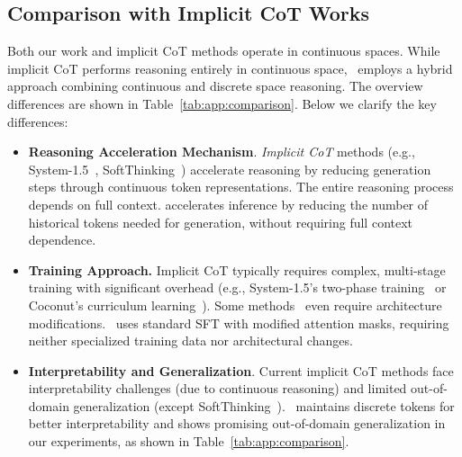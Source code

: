 \subsection{Comparison with Implicit CoT Works}

Both our work and implicit CoT methods operate in continuous spaces.
While implicit CoT performs reasoning entirely in continuous space, \ours~employs a hybrid approach combining continuous and discrete space reasoning. 
The overview differences are shown in Table~\ref{tab:app:comparison}.
Below we clarify the key differences:
\begin{itemize}
    \item \textbf{Reasoning Acceleration Mechanism}.
    \emph{Implicit CoT} methods (e.g., System-1.5~\cite{arxiv25_system_1_5}, SoftThinking~\cite{arxiv25_soft_thinking}) accelerate reasoning by reducing generation steps through continuous token representations. 
    The entire reasoning process depends on full context.
    \emph{\ours} accelerates inference by reducing the number of historical tokens needed for generation, without requiring full context dependence.

    \item \textbf{Training Approach.}
    Implicit CoT typically requires complex, multi-stage training with significant overhead (e.g., System-1.5's two-phase training~\cite{arxiv25_system_1_5} or Coconut's curriculum learning~\citep{arxiv24_coconut}). Some methods~\cite{arxiv25_soft_thinking, arxiv24_ccot} even require architecture modifications.
    \ours~uses standard SFT with modified attention masks, requiring neither specialized training data nor architectural changes.

    \item \textbf{Interpretability and Generalization}.
    Current implicit CoT methods face interpretability challenges (due to continuous reasoning) and limited out-of-domain generalization (except SoftThinking~\cite{arxiv25_soft_thinking}).
    \ours~maintains discrete tokens for better interpretability and shows promising out-of-domain generalization in our experiments, as shown in Table~\ref{tab:app:comparison}.

\end{itemize}

